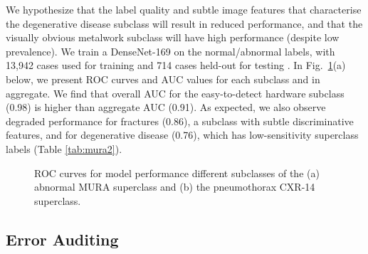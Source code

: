 \documentclass{article}
\begin{document}
We hypothesize that the label quality and subtle image features that characterise the degenerative disease subclass will result in reduced performance, and that the visually obvious metalwork subclass will have high performance (despite low prevalence).
 We train a DenseNet-169 on the normal/abnormal labels, with 13,942 cases used for training and 714 cases held-out for testing \citep{Rajpurkar2017-rc}.  
 In Fig.~\ref{fig:rocs}(a) below, we present ROC curves and AUC values for each subclass and in aggregate.  
 We find that overall AUC for the easy-to-detect hardware subclass (0.98) is higher than aggregate AUC (0.91).
 As expected, we also observe degraded performance for fractures (0.86), a subclass with subtle discriminative features, and for degenerative disease (0.76), which has low-sensitivity superclass labels (Table \ref{tab:mura2}).  

 \begin{figure}[htb!]%
 \vspace{-5mm}
\centering
{}%
\caption{ROC curves for model performance different subclasses of the (a) abnormal MURA superclass and (b) the pneumothorax CXR-14 superclass.}
\label{fig:rocs}
\vspace{-4 mm}
\end{figure}


\subsection{Error Auditing}
\end{document}
